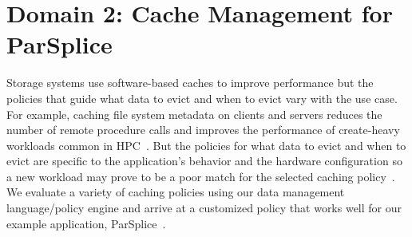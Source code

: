 %
%

\section{Domain 2: Cache Management for ParSplice}

Storage systems use software-based caches to improve performance but the
policies that guide what data to evict and when to evict vary with the use
case. For example, caching file system metadata on clients and servers reduces
the number of remote procedure calls and improves the performance of
create-heavy workloads common in HPC~\cite{ren:sc2014-indexfs,
patil:fast2011-giga+, weil:sc2004-dyn-metadata}. But the policies for what data
to evict and when to evict are specific to the application's behavior and the
hardware configuration so a new workload may prove to be a poor match for the
selected caching
policy~\cite{xiao:socc15-shardfs,brandt:msst2003-lh,sevilla:sc15-mantle,
weil:sc2004-dyn-metadata, weil:osdi2006-ceph}. We evaluate a variety of caching
policies using our data management language/policy engine and arrive at a
customized policy that works well for our example application,
ParSplice~\cite{perez:jctc20150parsplice}.

